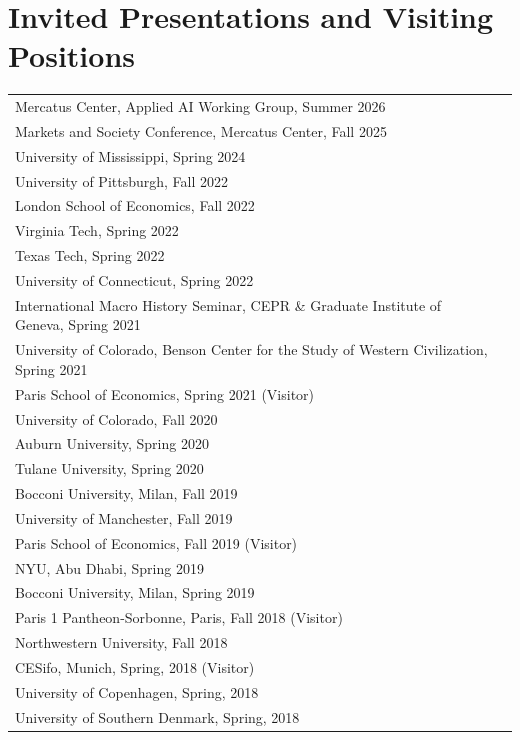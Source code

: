 \documentclass[11pt,fullpage]{article}
\begin{document}
\vspace{.20cm}

\setlength{\extrarowheight}{1pt}


\section*{Invited Presentations and Visiting Positions}

\begin{longtable}{ll}
	Mercatus Center, Applied AI Working Group, Summer 2026\\
	Markets and Society Conference, Mercatus Center, Fall 2025\\
	University of Mississippi, Spring 2024\\
	University of Pittsburgh, Fall 2022\\
	London School of Economics, Fall 2022\\
	Virginia Tech, Spring 2022 \\
	Texas Tech, Spring 2022 \\
	University of Connecticut, Spring 2022 \\
	International Macro History Seminar, CEPR \& Graduate Institute of Geneva, Spring 2021 \\
	University of Colorado, Benson Center for the Study of Western Civilization, Spring 2021 \\
	Paris School of Economics, Spring 2021 (Visitor) \\
	University of Colorado, Fall 2020 \\
	Auburn University, Spring 2020 \\
	Tulane University, Spring 2020 \\
	Bocconi University, Milan, Fall 2019 \\
	University of Manchester, Fall 2019 \\
	Paris School of Economics, Fall 2019 (Visitor) \\
	NYU, Abu Dhabi, Spring 2019 \\
	Bocconi University, Milan, Spring 2019  \\
	Paris 1 Pantheon-Sorbonne, Paris, Fall 2018 (Visitor) \\
	Northwestern University, Fall 2018 \\
	CESifo, Munich, Spring, 2018 (Visitor) \\
	University of Copenhagen, Spring, 2018 \\
	University of Southern Denmark, Spring, 2018 \\

\end{longtable}
\end{document}
